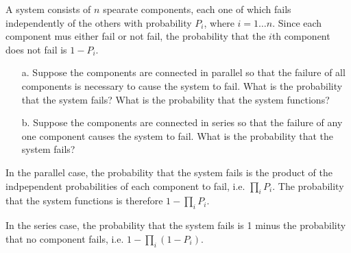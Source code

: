 

A system consists of $n$ spearate components, each one of which fails independently of the others with probability $P_i$, where $i=1 \ldots n$.
Since each component mus either fail or not fail, the probability that the $i$th component does not fail is $1 - P_i$.

\begin{itemize}
  \item[a.] Suppose the components are connected in parallel so that the failure of all components is necessary to cause the system to fail.
What is the probability that the system fails?
What is the probability that the system functions?

  \item[b.] Suppose the components are connected in series so that the failure of any one component causes the system to fail.
What is the probability that the system fails?
\end{itemize}


In the parallel case, the probability that the system fails is the product of the indpependent probabilities of each component to fail, i.e. $\prod_i P_i$.
The probability that the system functions is therefore $1 - \prod_i P_i$.

In the series case, the probability that the system fails is 1 minus the probability that no component fails, i.e. $1 - \prod_i (1 - P_i)$.
